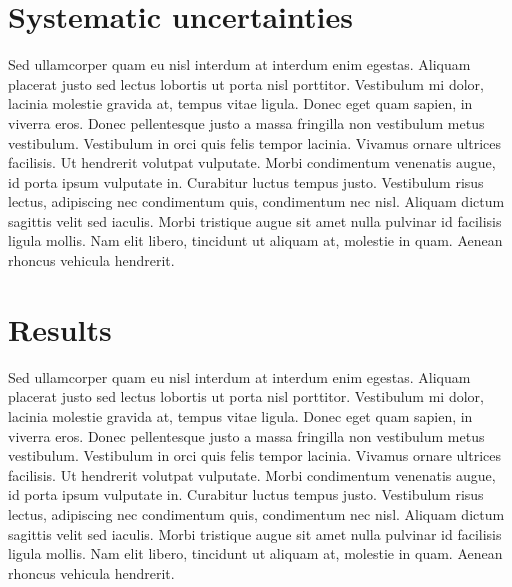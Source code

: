 
\section{Systematic uncertainties}

Sed ullamcorper quam eu nisl interdum at interdum enim egestas. Aliquam placerat justo sed lectus lobortis ut porta nisl porttitor. Vestibulum mi dolor, lacinia molestie gravida at, tempus vitae ligula. Donec eget quam sapien, in viverra eros. Donec pellentesque justo a massa fringilla non vestibulum metus vestibulum. Vestibulum in orci quis felis tempor lacinia. Vivamus ornare ultrices facilisis. Ut hendrerit volutpat vulputate. Morbi condimentum venenatis augue, id porta ipsum vulputate in. Curabitur luctus tempus justo. Vestibulum risus lectus, adipiscing nec condimentum quis, condimentum nec nisl. Aliquam dictum sagittis velit sed iaculis. Morbi tristique augue sit amet nulla pulvinar id facilisis ligula mollis. Nam elit libero, tincidunt ut aliquam at, molestie in quam. Aenean rhoncus vehicula hendrerit.


\section{Results}

Sed ullamcorper quam eu nisl interdum at interdum enim egestas. Aliquam placerat justo sed lectus lobortis ut porta nisl porttitor. Vestibulum mi dolor, lacinia molestie gravida at, tempus vitae ligula. Donec eget quam sapien, in viverra eros. Donec pellentesque justo a massa fringilla non vestibulum metus vestibulum. Vestibulum in orci quis felis tempor lacinia. Vivamus ornare ultrices facilisis. Ut hendrerit volutpat vulputate. Morbi condimentum venenatis augue, id porta ipsum vulputate in. Curabitur luctus tempus justo. Vestibulum risus lectus, adipiscing nec condimentum quis, condimentum nec nisl. Aliquam dictum sagittis velit sed iaculis. Morbi tristique augue sit amet nulla pulvinar id facilisis ligula mollis. Nam elit libero, tincidunt ut aliquam at, molestie in quam. Aenean rhoncus vehicula hendrerit.



